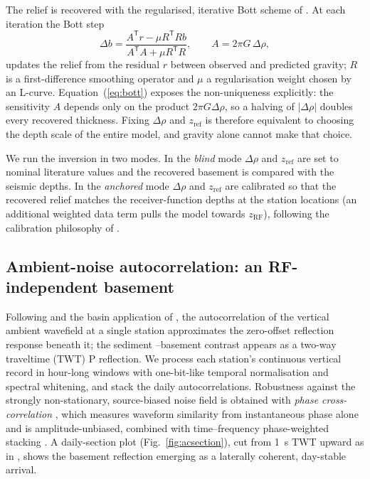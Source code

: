 The relief is recovered with the regularised, iterative Bott scheme of
\citet{Uieda2017}. At each iteration the Bott step
\begin{equation}
\Delta b = \frac{A^{\mathsf T}r-\mu R^{\mathsf T}Rb}{A^{\mathsf T}A+\mu R^{\mathsf T}R},
\qquad A = 2\pi G\,\Delta\rho,
\label{eq:bott}
\end{equation}
updates the relief from the residual $r$ between observed and predicted gravity;
$R$ is a first-difference smoothing operator and $\mu$ a regularisation weight
chosen by an L-curve. Equation~(\ref{eq:bott}) exposes the non-uniqueness
explicitly: the sensitivity $A$ depends only on the product $2\pi G\Delta\rho$, so
a halving of $|\Delta\rho|$ doubles every recovered thickness. Fixing
$\Delta\rho$ and $z_{\mathrm{ref}}$ is therefore equivalent to choosing the depth
scale of the entire model, and gravity alone cannot make that choice.

We run the inversion in two modes. In the \emph{blind} mode $\Delta\rho$ and
$z_{\mathrm{ref}}$ are set to nominal literature values and the recovered
basement is compared with the seismic depths. In the \emph{anchored} mode
$\Delta\rho$ and $z_{\mathrm{ref}}$ are calibrated so that the recovered relief
matches the receiver-function depths at the station locations (an additional
weighted data term pulls the model towards $z_{\mathrm{RF}}$), following the
calibration philosophy of \citet{Uieda2017}.

\subsection{Ambient-noise autocorrelation: an RF-independent basement}
\label{sec:ac}
Following \citet{Claerbout1968} and the basin application of \citet{Romero2018},
the autocorrelation of the vertical ambient wavefield at a single station
approximates the zero-offset reflection response beneath it; the sediment
--basement contrast appears as a two-way traveltime (TWT) P reflection. We
process each station's continuous vertical record in hour-long windows with
one-bit-like temporal normalisation and spectral whitening, and stack the daily
autocorrelations. Robustness against the strongly non-stationary, source-biased
noise field is obtained with \emph{phase cross-correlation}
\citep{Schimmel1999}, which measures waveform similarity from instantaneous
phase alone and is amplitude-unbiased, combined with time--frequency
phase-weighted stacking \citep{SchimmelPaulssen1997,SchimmelGallart2007}. A
daily-section plot (Fig.~\ref{fig:acsection}), cut from 1~s TWT upward as in
\citet{Romero2018}, shows the basement reflection emerging as a laterally
coherent, day-stable arrival.


